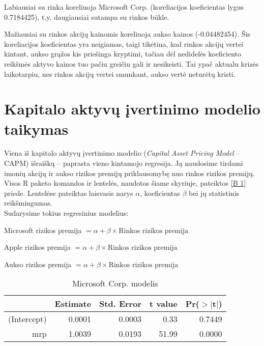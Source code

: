 \documentclass[12pt, a14paper, lithuanian]{article}
\begin{document}
Labiausiai su rinka koreliuoja Microsoft Corp. (koreliacijos koeficientas lygus 0.7184425), t.y. daugiausiai sutampa su rinkos būkle.

Mažiausiai su rinkos akcijų kainomis koreliuoja aukso kainos (-0.04482454). Šis koreliacijos koeficientas yra neigiamas, taigi tikėtina, kad rinkos akcijų vertei kintant, aukso grąžos kis priešinga kryptimi, tačiau dėl nedidelės koeficiento reikšmės aktyvo kainos tuo pačiu greičiu gali ir nesikeisti. Tai ypač aktualu krizės laikotarpiu, nes rinkos akcijų vertei smunkant, aukso vertė neturėtų kristi.



\newpage
\section{Kapitalo aktyvų įvertinimo modelio taikymas}

Viena iš kapitalo aktyvų įvertinimo modelio (\textit{Capital Asset Pricing Model} -- CAPM) išraiškų -- paprasta vieno kintamojo regresija. Ją naudosime tirdami imonių akcijų ir aukso rizikos premijų priklausomybę nuo rinkos rizikos premijų. Visos R paketo komandos ir lentelės, naudotos šiame skyriuje, pateiktos \ref{B 1} priede.
Lentelėse pateiktas laisvasis narys $ \alpha $, koeficientas  $ \beta $ bei jų statistinis reikšmingumas.\\

Sudarysime tokius regresinius modelius:

Microsoft rizikos premija $= \alpha + \beta \times  \text {Rinkos rizikos premija}$

Apple rizikos premija $= \alpha + \beta \times  \text {Rinkos rizikos premija}$

Aukso rizikos premija $= \alpha + \beta \times \text {Rinkos rizikos premija}$



\begin{table}[ht]
\begin{center}
\begin{tabular}{rrrrr}
  \hline
 & Estimate & Std. Error & t value & Pr($>$$|$t$|$) \\ 
  \hline
(Intercept) & 0.0001 & 0.0003 & 0.33 & 0.7449 \\ 
  mrp & 1.0039 & 0.0193 & 51.99 & 0.0000 \\ 
   \hline
\end{tabular}
\end{center}
\caption{Microsoft Corp. modelis}
\end{table}
\end{document}
